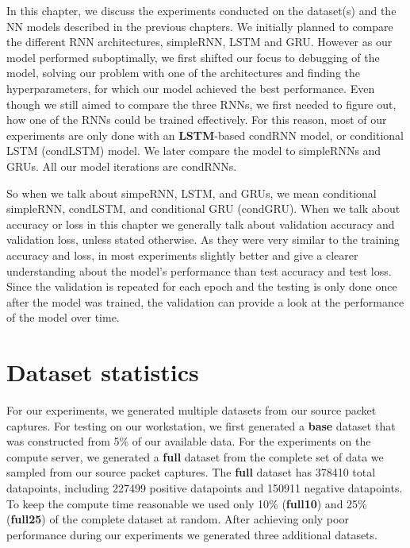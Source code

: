 \documentclass[
	ngerman,
	ruledheaders=section,%
	class=report,%
	thesis={type=bachelor},%
	accentcolor=9c,%
	custommargins=true,%
	marginpar=false,%
	parskip=half-,%
	fontsize=11pt,%
	twoside
]{tudapub}
\begin{document}
In this chapter, we discuss the experiments conducted on the dataset(s) and the NN models described in the previous chapters.
We initially planned to compare the different RNN architectures, simpleRNN, LSTM and GRU.
However as our model performed suboptimally, we first shifted our focus to debugging of the model, solving our problem with one of the architectures and finding the hyperparameters, for which our model achieved the best performance.
Even though we still aimed to compare the three RNNs, we first needed to figure out, how one of the RNNs could be trained effectively.
For this reason, most of our experiments are only done with an \textbf{LSTM}-based condRNN model, or conditional LSTM (condLSTM) model.
We later compare the model to simpleRNNs and GRUs.
All our model iterations are condRNNs.

So when we talk about simpeRNN, LSTM, and GRUs, we mean conditional simpleRNN, condLSTM, and conditional GRU (condGRU).
When we talk about accuracy or loss in this chapter we generally talk about validation accuracy and validation loss, unless stated otherwise.
As they were very similar to the training accuracy and loss, in most experiments slightly better and give a clearer understanding about the model's performance than test accuracy and test loss.
Since the validation is repeated for each epoch and the testing is only done once after the model was trained, the validation can provide a look at the performance of the model over time.

\section{Dataset statistics}
\label{sec:datasetStats}

For our experiments, we generated multiple datasets from our source packet captures.
For testing on our workstation, we first generated a \textbf{base} dataset that was constructed from 5\% of our available data.
For the experiments on the compute server, we generated a \textbf{full} dataset from the complete set of data we sampled from our source packet captures.
The \textbf{full} dataset has 378410 total datapoints, including 227499 positive datapoints and 150911 negative datapoints.
To keep the compute time reasonable we used only 10\% (\textbf{full10}) and 25\% (\textbf{full25}) of the complete dataset at random.
After achieving only poor performance during our experiments we generated three additional datasets.
\end{document}
